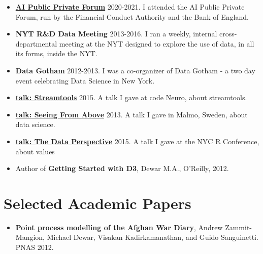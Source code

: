 \documentclass[line, overlapped]{res}
\begin{document}
\begin{resume}
\begin{itemize}
\item
	\href{https://www.bankofengland.co.uk/research/fintech/ai-public-private-forum}{\textbf{AI Public Private Forum}} 2020-2021. I attended the AI Public
  Private Forum, run by the Financial Conduct Authority and the Bank of
  England.
\item
  \textbf{NYT R\&D Data Meeting} 2013-2016. I ran a weekly, internal
  cross-departmental meeting at the NYT designed to explore the use of
  data, in all its forms, inside the NYT.
\item
  \textbf{Data Gotham} 2012-2013. I was a co-organizer of Data Gotham -
  a two day event celebrating Data Science in New York.
\item
	\href{https://www.youtube.com/watch?v=23FgdEHOt0w}{\textbf{talk: Streamtools}} 2015. A talk  I gave at code Neuro, about streamtools.
\item
	\href{http://videos.theconference.se/mike-dewar-big-data-understand-and}{\textbf{talk: Seeing From Above}} 2013. A talk I gave in Malmo, Sweden, about data science.
\item
	\href{https://www.youtube.com/watch?v=Jsg4R9z\_Z7M}{\textbf{talk: The Data Perspective}} 2015. A talk I gave at the NYC R Conference, about values 
\item
  Author of \textbf{Getting Started with D3}, Dewar M.A., O'Reilly,
  2012.
\end{itemize}

\section{Selected Academic Papers}

\begin{itemize}
\item
  \textbf{Point process modelling of the Afghan War Diary}, Andrew
  Zammit-Mangion, Michael Dewar, Visakan Kadirkamanathan, and Guido
  Sanguinetti. PNAS 2012.


\end{itemize}
\end{resume}
\end{document}

